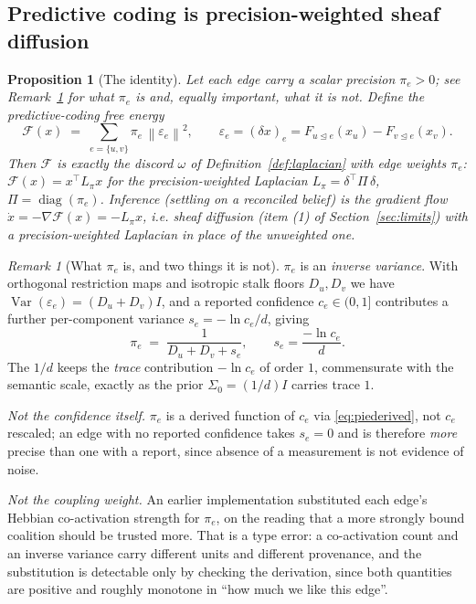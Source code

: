\documentclass[11pt]{article}
\theoremstyle{definition}
\theoremstyle{plain}
\newtheorem{proposition}[definition]{Proposition}
\theoremstyle{remark}
\newtheorem{remark}[definition]{Remark}
\newcommand{\rest}[1]{F_{#1}}
\newcommand{\diag}{\operatorname{diag}}
\newcommand{\norm}[1]{\left\lVert #1 \right\rVert}
\newcommand{\triang}{\trianglelefteq}
\begin{document}
\subsection{Predictive coding is precision-weighted sheaf diffusion}

\begin{proposition}[The identity]\label{prop:pc}
Let each edge carry a scalar precision $\pi_e>0$; see Remark~\ref{rem:pie} for what
$\pi_e$ is and, equally important, what it is not. Define the \emph{predictive-coding
free energy}
\begin{equation}\label{eq:pcfreeenergy}
\mathcal F(x)\;=\;\sum_{e=\{u,v\}}\pi_e\,\norm{\varepsilon_e}^2,
\qquad \varepsilon_e=(\delta x)_e=\rest{u\triang e}(x_u)-\rest{v\triang e}(x_v).
\end{equation}
Then $\mathcal F$ is exactly the discord $\omega$ of Definition~\ref{def:laplacian}
with edge weights $\pi_e$: $\mathcal F(x)=x^\top L_\pi x$ for the precision-weighted
Laplacian $L_\pi=\delta^\top \Pi\, \delta$, $\Pi=\diag(\pi_e)$. \emph{Inference}
(settling on a reconciled belief) is the gradient flow $\dot x=-\nabla\mathcal
F(x)=-L_\pi x$, i.e. sheaf diffusion (item (1) of Section~\ref{sec:limits}) with a
precision-weighted Laplacian in place of the unweighted one.
\end{proposition}

\begin{remark}[What $\pi_e$ is, and two things it is not]\label{rem:pie}
$\pi_e$ is an \emph{inverse variance}. With orthogonal restriction maps and isotropic
stalk floors $D_u,D_v$ we have $\operatorname{Var}(\varepsilon_e)=(D_u+D_v)I$, and a
reported confidence $c_e\in(0,1]$ contributes a further per-component variance
$s_e=-\ln c_e/d$, giving
\begin{equation}\label{eq:piederived}
\pi_e\;=\;\frac{1}{D_u+D_v+s_e},\qquad s_e=\frac{-\ln c_e}{d}.
\end{equation}
The $1/d$ keeps the \emph{trace} contribution $-\ln c_e$ of order $1$, commensurate with
the semantic scale, exactly as the prior $\Sigma_0=(1/d)I$ carries trace $1$.

\emph{Not the confidence itself.} $\pi_e$ is a derived function of $c_e$ via
\eqref{eq:piederived}, not $c_e$ rescaled; an edge with no reported confidence takes
$s_e=0$ and is therefore \emph{more} precise than one with a report, since absence of a
measurement is not evidence of noise.

\emph{Not the coupling weight.} An earlier implementation substituted each edge's Hebbian
co-activation strength for $\pi_e$, on the reading that a more strongly bound coalition
should be trusted more. That is a type error: a co-activation count and an inverse
variance carry different units and different provenance, and the substitution is
detectable only by checking the derivation, since both quantities are positive and
roughly monotone in ``how much we like this edge''.
\end{remark}
\end{document}
